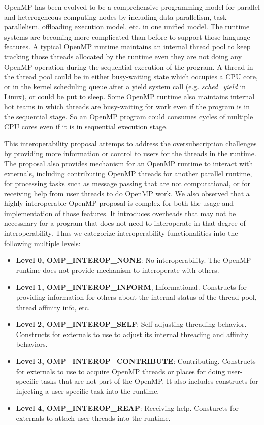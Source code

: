 OpenMP has been evolved to be a comprehensive programming model for parallel and heterogeneous computing nodes by including 
data parallelism, task parallelism, offloading execution model, etc. in one unified model. 
The runtime systems are becoming more complicated than before to support those language features.
A typical OpenMP runtime maintains an internal thread pool to keep tracking those threads allocated by the runtime even they are not  
doing any OpenMP operation during the sequential execution of the program. 
A thread in the thread pool could be in either busy-waiting state which occupies a CPU core, or in the kernel
scheduling queue after a yield system call (e.g. {\em sched\_yield} in Linux), or could be put to sleep. 
Some OpenMP runtime also maintains
internal hot teams in which threads are busy-waiting for work even if the program is in the sequential stage. 
So an OpenMP program could 
consumes cycles of multiple CPU cores even if it is in sequential execution stage.

This interoperability proposal attemps to address the oversubscription challenges by providing more information or control
to users for the threads in the runtime. The proposal also provides mechanism for an OpenMP runtime to interact with externals, including 
contributing OpenMP threads for another parallel runtime, for processing tasks such as message passing that are not computational, or for receiving
help from user threads to do OpenMP work. We also observed that a highly-interoperable OpenMP proposal is 
complex for both the usage and implementation of those features. It introduces
overheads that may not be necessnary for a program that does not need to interoperate in that degree of interoperability. 
Thus we
categorize interoperability functionalities into the following multiple levels: 
\begin{itemize}
	\item {\bf Level 0, OMP\_INTEROP\_NONE}: No interoperability. The OpenMP runtime does not provide mechanism to interoperate with others.
	\item {\bf Level 1, OMP\_INTEROP\_INFORM}, Informational. Constructs for providing information for others about the internal status of the thread pool, thread affinity info, etc. 
	\item {\bf Level 2, OMP\_INTEROP\_SELF}: Self adjusting threading behavior. Constructs for
		externals to use to adjust its internal threading and affinity behaviors.
	\item {\bf Level 3, OMP\_INTEROP\_CONTRIBUTE}: Contributing. Constructs for externals to use to acquire OpenMP 
		threads or places for doing user-specific tasks that are not part of the OpenMP. It also includes constructs for injecting
		a user-specific task into the runtime. 
	\item {\bf Level 4, OMP\_INTEROP\_REAP}: Receiving help. Consturcts for externals to attach user threads into the runtime.
\end{itemize}

